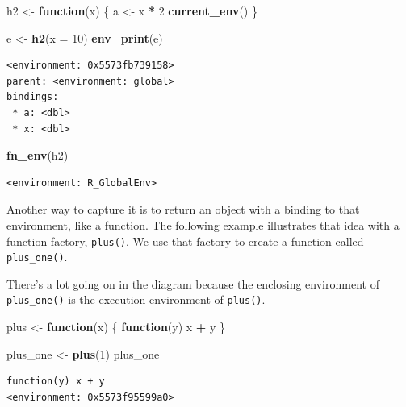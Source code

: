 \documentclass[]{book}
\newenvironment{Shaded}{\begin{snugshade}}{\end{snugshade}}
\newcommand{\ControlFlowTok}[1]{\textcolor[rgb]{0.13,0.29,0.53}{\textbf{#1}}}
\newcommand{\DataTypeTok}[1]{\textcolor[rgb]{0.13,0.29,0.53}{#1}}
\newcommand{\DecValTok}[1]{\textcolor[rgb]{0.00,0.00,0.81}{#1}}
\newcommand{\KeywordTok}[1]{\textcolor[rgb]{0.13,0.29,0.53}{\textbf{#1}}}
\newcommand{\NormalTok}[1]{#1}
\newcommand{\OperatorTok}[1]{\textcolor[rgb]{0.81,0.36,0.00}{\textbf{#1}}}
\newcommand{\StringTok}[1]{\textcolor[rgb]{0.31,0.60,0.02}{#1}}
\theoremstyle{definition}
\theoremstyle{definition}
\theoremstyle{definition}
\theoremstyle{remark}
\begin{document}
\begin{Shaded}
\begin{Highlighting}[]
\NormalTok{h2 <-}\StringTok{ }\ControlFlowTok{function}\NormalTok{(x) \{}
\NormalTok{  a <-}\StringTok{ }\NormalTok{x }\OperatorTok{*}\StringTok{ }\DecValTok{2}
  \KeywordTok{current_env}\NormalTok{()}
\NormalTok{\}}

\NormalTok{e <-}\StringTok{ }\KeywordTok{h2}\NormalTok{(}\DataTypeTok{x =} \DecValTok{10}\NormalTok{)}
\KeywordTok{env_print}\NormalTok{(e)}
\end{Highlighting}
\end{Shaded}

\begin{verbatim}
<environment: 0x5573fb739158>
parent: <environment: global>
bindings:
 * a: <dbl>
 * x: <dbl>
\end{verbatim}

\begin{Shaded}
\begin{Highlighting}[]
\KeywordTok{fn_env}\NormalTok{(h2)}
\end{Highlighting}
\end{Shaded}

\begin{verbatim}
<environment: R_GlobalEnv>
\end{verbatim}

Another way to capture it is to return an object with a binding to that
environment, like a function. The following example illustrates that
idea with a function factory, \texttt{plus()}. We use that factory to
create a function called \texttt{plus\_one()}.

There's a lot going on in the diagram because the enclosing environment
of \texttt{plus\_one()} is the execution environment of \texttt{plus()}.

\begin{Shaded}
\begin{Highlighting}[]
\NormalTok{plus <-}\StringTok{ }\ControlFlowTok{function}\NormalTok{(x) \{}
  \ControlFlowTok{function}\NormalTok{(y) x }\OperatorTok{+}\StringTok{ }\NormalTok{y}
\NormalTok{\}}

\NormalTok{plus_one <-}\StringTok{ }\KeywordTok{plus}\NormalTok{(}\DecValTok{1}\NormalTok{)}
\NormalTok{plus_one}
\end{Highlighting}
\end{Shaded}

\begin{verbatim}
function(y) x + y
<environment: 0x5573f95599a0>
\end{verbatim}
\end{document}
